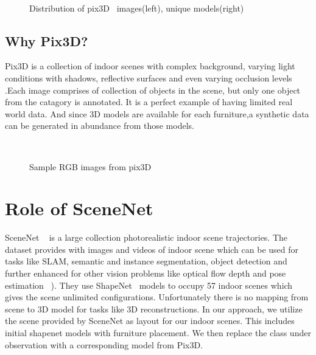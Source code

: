 \begin{figure}[!ht]
    \centering
    \quad
    \\
    \caption{Distribution of pix3D~\cite{pix3d} images(left), unique models(right)}
    \label{fig:pix3d_histogram}
\end{figure}

\subsection{Why Pix3D?}
    Pix3D is a collection of indoor scenes with complex background, varying light conditions with shadows, reflective surfaces and even varying occlusion levels
    .Each image comprises of collection of objects in the scene, but only one object from the catagory is annotated. It is a perfect example of having limited real world data.
    And since 3D models are available for each furniture,a synthetic data can be generated in abundance from those models.

\begin{figure}[!ht]
    \centering
    \quad
    \\
    \quad
    \caption{Sample RGB images from pix3D}
    \label{fig:Pix3D samples}
\end{figure}

\section{Role of SceneNet}\label{ss:SceneNet}
    SceneNet ~\cite{McCormac:etal:ICCV2017} is a large collection photorealistic indoor scene trajectories.
    The dataset provides with images and videos of indoor scene which can be used for tasks like SLAM, semantic and instance segmentation,
object detection and further enhanced for other vision problems like optical flow depth and pose estimation ~\cite{McCormac:etal:ICCV2017}).
They use ShapeNet~\cite{chang2015shapenet} models to occupy 57 indoor scenes which gives the scene unlimited configurations.
Unfortunately there is no mapping from scene to 3D model for tasks like 3D reconstructions.
In our approach, we utilize the scene provided by SceneNet as layout for our indoor scenes. This includes initial shapenet models with furniture placement.
We then replace the class under observation with a corresponding model from Pix3D.

